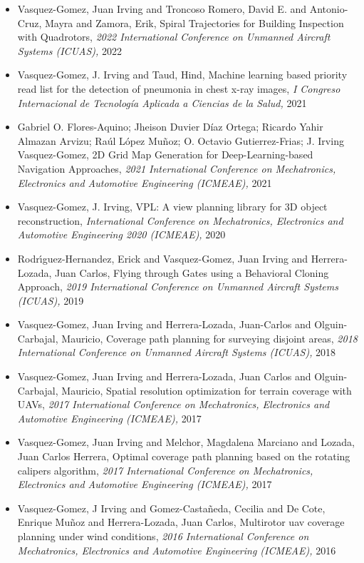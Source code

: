\begin{itemize} 
\item Vasquez-Gomez, Juan Irving and Troncoso Romero, David E. and Antonio-Cruz, Mayra and Zamora, Erik, Spiral Trajectories for Building Inspection with Quadrotors, \textit{ 2022 International Conference on Unmanned Aircraft Systems (ICUAS),} 2022 
\item Vasquez-Gomez, J. Irving and Taud, Hind, Machine learning based priority read list for the detection of pneumonia in chest x-ray images, \textit{ I Congreso Internacional de Tecnología Aplicada a Ciencias de la Salud,} 2021 
\item Gabriel O. Flores-Aquino; Jheison Duvier Díaz Ortega; Ricardo Yahir Almazan Arvizu; Raúl López Muñoz; O. Octavio Gutierrez-Frias; J. Irving Vasquez-Gomez, 2D Grid Map Generation for Deep-Learning-based Navigation Approaches, \textit{ 2021 International Conference on Mechatronics, Electronics and Automotive Engineering (ICMEAE),} 2021 
\item Vasquez-Gomez, J. Irving, VPL: A view planning library for 3D object reconstruction, \textit{ International Conference on Mechatronics, Electronics and Automotive Engineering 2020 (ICMEAE),} 2020 
\item Rodr{\'\i}guez-Hernandez, Erick and Vasquez-Gomez, Juan Irving and Herrera-Lozada, Juan Carlos, Flying through Gates using a Behavioral Cloning Approach, \textit{ 2019 International Conference on Unmanned Aircraft Systems (ICUAS),} 2019 
\item Vasquez-Gomez, Juan Irving and Herrera-Lozada, Juan-Carlos and Olguin-Carbajal, Mauricio, Coverage path planning for surveying disjoint areas, \textit{ 2018 International Conference on Unmanned Aircraft Systems (ICUAS),} 2018 
\item Vasquez-Gomez, Juan Irving and Herrera-Lozada, Juan Carlos and Olguin-Carbajal, Mauricio, Spatial resolution optimization for terrain coverage with UAVs, \textit{ 2017 International Conference on Mechatronics, Electronics and Automotive Engineering (ICMEAE),} 2017 
\item Vasquez-Gomez, Juan Irving and Melchor, Magdalena Marciano and Lozada, Juan Carlos Herrera, Optimal coverage path planning based on the rotating calipers algorithm, \textit{ 2017 International Conference on Mechatronics, Electronics and Automotive Engineering (ICMEAE),} 2017 
\item Vasquez-Gomez, J Irving and Gomez-Casta{\~n}eda, Cecilia and De Cote, Enrique Mu{\~n}oz and Herrera-Lozada, Juan Carlos, Multirotor uav coverage planning under wind conditions, \textit{ 2016 International Conference on Mechatronics, Electronics and Automotive Engineering (ICMEAE),} 2016 

\end{itemize}

